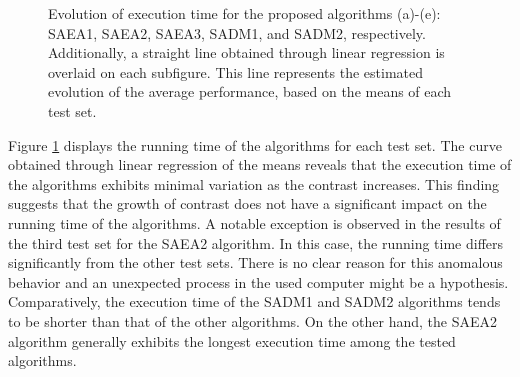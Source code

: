 \begin{figure}
				\caption[Evolution of execution time for the proposed algorithms in benchmark study.]{Evolution of execution time for the proposed algorithms (a)-(e): SAEA1, SAEA2, SAEA3, SADM1, and SADM2, respectively. Additionally, a straight line obtained through linear regression is overlaid on each subfigure. This line represents the estimated evolution of the average performance, based on the means of each test set.}
				\label{fig:results:benchmark:time}
			\end{figure}
		
			
			Figure \ref{fig:results:benchmark:time} displays the running time of the algorithms for each test set. The curve obtained through linear regression of the means reveals that the execution time of the algorithms exhibits minimal variation as the contrast increases. This finding suggests that the growth of contrast does not have a significant impact on the running time of the algorithms. A notable exception is observed in the results of the third test set for the SAEA2 algorithm. In this case, the running time differs significantly from the other test sets. There is no clear reason for this anomalous behavior and an unexpected process in the used computer might be a hypothesis. Comparatively, the execution time of the SADM1 and SADM2 algorithms tends to be shorter than that of the other algorithms. On the other hand, the SAEA2 algorithm generally exhibits the longest execution time among the tested algorithms.
		
